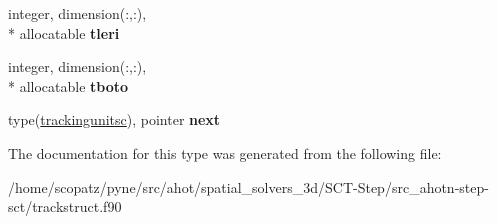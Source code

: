 \begin{DoxyCompactItemize}
\item 
\hypertarget{structtracking__data__structures_1_1trackingunitsc_af498c2cfd96a18df741805988a6d3ea5}{integer, dimension(\-:,\-:), \\*
allocatable {\bfseries tleri}}\label{structtracking__data__structures_1_1trackingunitsc_af498c2cfd96a18df741805988a6d3ea5}

\item 
\hypertarget{structtracking__data__structures_1_1trackingunitsc_a6b3cceaa9cf6b60ea0330fc48f3ab107}{integer, dimension(\-:,\-:), \\*
allocatable {\bfseries tboto}}\label{structtracking__data__structures_1_1trackingunitsc_a6b3cceaa9cf6b60ea0330fc48f3ab107}

\item 
\hypertarget{structtracking__data__structures_1_1trackingunitsc_ad91a2408f427440a9f4a543bc5923a92}{type(\hyperlink{structtracking__data__structures_1_1trackingunitsc}{trackingunitsc}), pointer {\bfseries next}}\label{structtracking__data__structures_1_1trackingunitsc_ad91a2408f427440a9f4a543bc5923a92}

\end{DoxyCompactItemize}


The documentation for this type was generated from the following file\-:\begin{DoxyCompactItemize}
\item 
/home/scopatz/pyne/src/ahot/spatial\-\_\-solvers\-\_\-3d/\-S\-C\-T-\/\-Step/src\-\_\-ahotn-\/step-\/sct/trackstruct.\-f90\end{DoxyCompactItemize}
